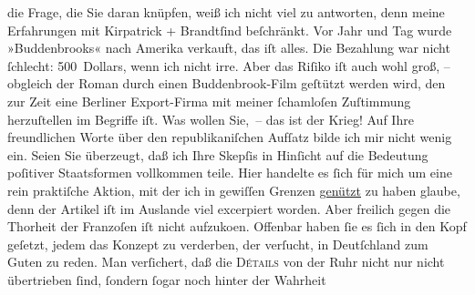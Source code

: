 \begin{ledgroupsized}[t]{13cm}
                    die Frage, die Sie daran knüpfen, weiß ich nicht viel zu antworten, denn meine
                    Erfahrungen mit Kirpatrick + Brandtſind beſchränkt. Vor Jahr und Tag wurde »Buddenbrooks« nach Amerika verkauft, das iſt alles. Die Bezahlung war nicht ſchlecht:
                    500 Dollars, wenn ich nicht irre. Aber das Riſiko iſt auch wohl groß, – obgleich
                    der Roman durch einen Buddenbrook-Film
                    geſtützt werden wird, den zur Zeit eine Berliner Export-Firma mit meiner ſchamloſen Zuſtimmung {\pb}herzuſtellen im Begriffe iſt. Was
                    wollen Sie, – das ist der Krieg!\pend
           \pstart
           Auf Ihre freundlichen Worte über den republikaniſchen Aufſatz bilde ich mir nicht wenig ein.
                    Seien Sie überzeugt, daß ich Ihre Skepſis in Hinſicht auf die Bedeutung
                    poſitiver Staatsformen vollkommen teile. Hier handelte es ſich für mich um eine
                    rein praktiſche Aktion, mit der ich in gewiſſen Grenzen \uline{genützt} zu haben glaube, denn der Artikel iſt im Auslande viel excerpiert worden. Aber
                    freilich gegen die Thorheit der Franzoſen iſt
                    nicht aufzuko{\geminationm}en. Offenbar haben ſie es ſich in den
                    Kopf geſetzt, jedem das Konzept zu verderben, der verſucht, in Deutſchland zum Guten zu reden. Man verſichert, daß die
                        \textsc{Détails} von der Ruhr nicht nur nicht übertrieben ſind, ſon{\pb}dern ſogar noch hinter der Wahrheit

\end{ledgroupsized}
